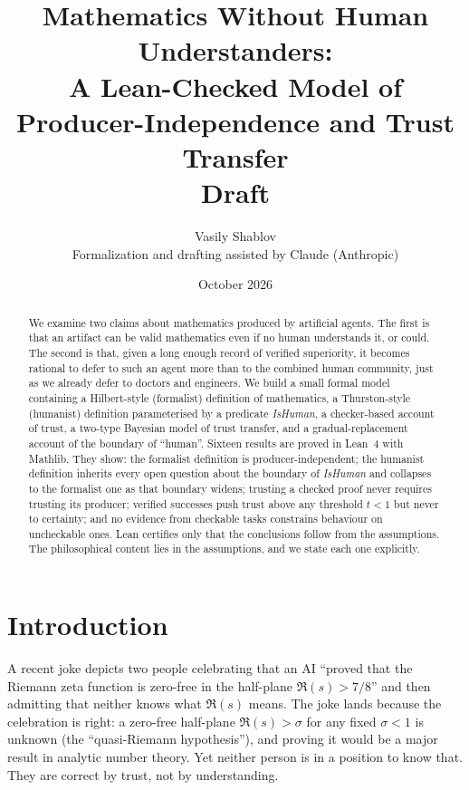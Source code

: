 \documentclass[11pt]{article}
\title{Mathematics Without Human Understanders:\\
A Lean-Checked Model of Producer-Independence and Trust Transfer\\[4pt]
\large Draft}
\author{Vasily Shablov\\[2pt]
\small Formalization and drafting assisted by Claude (Anthropic)}
\date{October 2026}
\theoremstyle{definition}
\theoremstyle{remark}
\begin{document}
\maketitle

\begin{abstract}
We examine two claims about mathematics produced by artificial agents. The first is that an
artifact can be valid mathematics even if no human understands it, or could. The second is
that, given a long enough record of verified superiority, it becomes rational to defer to such
an agent more than to the combined human community, just as we already defer to doctors and
engineers. We build a small formal model containing a Hilbert-style (formalist) definition of
mathematics, a Thurston-style (humanist) definition parameterised by a predicate
\emph{IsHuman}, a checker-based account of trust, a two-type Bayesian model of
trust transfer, and a gradual-replacement account of the boundary of ``human''. Sixteen
results are proved in Lean~4 with Mathlib. They show: the formalist definition is
producer-independent; the humanist definition inherits every open question about the boundary
of \emph{IsHuman} and collapses to the formalist one as that boundary widens; trusting a
checked proof never requires trusting its producer; verified successes push trust above any
threshold $t<1$ but never to certainty; and no evidence from checkable tasks constrains
behaviour on uncheckable ones. Lean certifies only that the conclusions follow from the
assumptions. The philosophical content lies in the assumptions, and we state each one
explicitly.
\end{abstract}

\section{Introduction}

A recent joke depicts two people celebrating that an AI ``proved that the Riemann zeta function
is zero-free in the half-plane $\Re(s) > 7/8$'' and then admitting that neither knows what
$\Re(s)$ means. The joke lands because the celebration is right: a zero-free half-plane
$\Re(s) > \sigma$ for any fixed $\sigma<1$ is unknown (the ``quasi-Riemann hypothesis''), and
proving it would be a major result in analytic number theory. Yet neither person is in a
position to know that. They are correct by trust, not by understanding.
\end{document}
